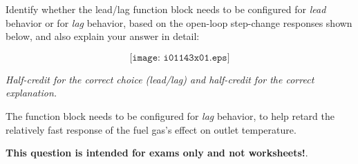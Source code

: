 

Identify whether the lead/lag function block needs to be configured for {\it lead} behavior or for {\it lag} behavior, based on the open-loop step-change responses shown below, and also explain your answer in detail:

$$\texttt{[image: i01143x01.eps]}$$

\vskip 50pt







{\it Half-credit for the correct choice (lead/lag) and half-credit for the correct explanation.}

\vskip 10pt

The function block needs to be configured for {\it lag} behavior, to help retard the relatively fast response of the fuel gas's effect on outlet temperature.







{\bf This question is intended for exams only and not worksheets!}.



